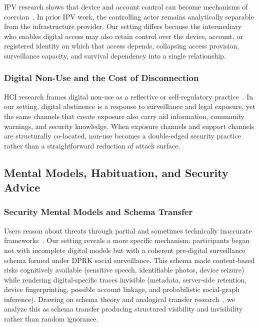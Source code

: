 \documentclass[conference,compsoc]{IEEEtran}
\begin{document}
IPV research shows that device and account control can become mechanisms of coercion~\cite{freed2017digital,matthews2017stories,leitao2019anticipating,tseng2022care,slupska2021threat}. In prior IPV work, the controlling actor remains analytically separable from the infrastructure provider. Our setting differs because the intermediary who enables digital access may also retain control over the device, account, or registered identity on which that access depends, collapsing access provision, surveillance capacity, and survival dependency into a single relationship.

\subsubsection{Digital Non-Use and the Cost of Disconnection}
HCI research frames digital non-use as a reflective or self-regulatory practice~\cite{baumer2013limiting,schoenebeck2014giving,satchell2009beyond}. In our setting, digital abstinence is a response to surveillance and legal exposure, yet the same channels that create exposure also carry aid information, community warnings, and security knowledge. When exposure channels and support channels are structurally co-located, non-use becomes a double-edged security practice rather than a straightforward reduction of attack surface.

\subsection{Mental Models, Habituation, and Security Advice}
\label{2.3}

\subsubsection{Security Mental Models and Schema Transfer}

Users reason about threats through partial and sometimes technically inaccurate frameworks~\cite{wash2010folk,wash2015too,krombholz2019if, hasegawa2024weird}. Our setting reveals a more specific mechanism: participants began not with incomplete digital models but with a coherent pre-digital surveillance schema formed under DPRK social surveillance. This schema made content-based risks cognitively available (sensitive speech, identifiable photos, device seizure) while rendering digital-specific traces invisible (metadata, server-side retention, device fingerprinting, possible account
linkage, and probabilistic social-graph inference). Drawing on schema theory and analogical transfer research~\cite{bartlett1932remembering,gick1983schema}, we analyze this as schema transfer producing structured visibility and invisibility rather than random ignorance.
\end{document}
